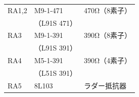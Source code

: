 \documentclass{beamer}                 %
\begin{document}
\begin{frame}
\begin{minipage}{0.54\columnwidth}
\begin{center}
{\begin{tabular}{l|l|l}
        \hline
        RA1,2 & M9-1-471   & 470Ω（8素子） \\
        &（L91S 471）&               \\
        RA3   & M9-1-391   & 390Ω（8素子） \\
        &（L91S 391）&               \\
        RA4   & M5-1-391   & 390Ω（4素子） \\
        &（L51S 391）&               \\
        RA5   & 8L103      & ラダー抵抗器  \\
      \end{tabular}}
    \end{center}
  \end{minipage}
\end{frame}

\end{document}
